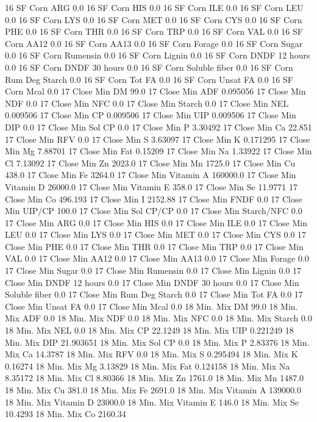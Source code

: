 \documentclass[letterpaper,10pt,english]{sphinxmanual}
\begin{document}
\begin{sphinxVerbatim}[commandchars=\\\{\},numbers=left,firstnumber=1,stepnumber=1]
16 SF Corn ARG 0.0
16 SF Corn HIS 0.0
16 SF Corn ILE 0.0
16 SF Corn LEU 0.0
16 SF Corn LYS 0.0
16 SF Corn MET 0.0
16 SF Corn CYS 0.0
16 SF Corn PHE 0.0
16 SF Corn THR 0.0
16 SF Corn TRP 0.0
16 SF Corn VAL 0.0
16 SF Corn AA\PYGZsh{}12 0.0
16 SF Corn AA\PYGZsh{}13 0.0
16 SF Corn \PYGZpc{} Forage 0.0
16 SF Corn Sugar \PYGZpc{} 0.0
16 SF Corn Rumensin 0.0
16 SF Corn Lignin 0.0
16 SF Corn DNDF 12 hours 0.0
16 SF Corn DNDF 30 hours 0.0
16 SF Corn Soluble fiber 0.0
16 SF Corn Rum Deg Starch 0.0
16 SF Corn Tot FA 0.0
16 SF Corn Unsat FA 0.0
16 SF Corn Mcal 0.0
17 Close Min DM 99.0
17 Close Min ADF 0.095056
17 Close Min NDF 0.0
17 Close Min NFC 0.0
17 Close Min Starch 0.0
17 Close Min NEL 0.009506
17 Close Min CP 0.009506
17 Close Min UIP 0.009506
17 Close Min DIP 0.0
17 Close Min Sol CP 0.0
17 Close Min P 3.30492
17 Close Min Ca 22.851
17 Close Min RFV 0.0
17 Close Min S 3.63097
17 Close Min K 0.171295
17 Close Min Mg 7.88701
17 Close Min Fat 0.15209
17 Close Min Na 1.33922
17 Close Min Cl 7.13092
17 Close Min Zn 2023.0
17 Close Min Mn 1725.0
17 Close Min Cu 438.0
17 Close Min Fe 3264.0
17 Close Min Vitamin A 160000.0
17 Close Min Vitamin D 26000.0
17 Close Min Vitamin E 358.0
17 Close Min Se 11.9771
17 Close Min Co 496.193
17 Close Min I 2152.88
17 Close Min FNDF 0.0
17 Close Min UIP/CP 100.0
17 Close Min Sol CP/CP 0.0
17 Close Min Starch/NFC 0.0
17 Close Min ARG 0.0
17 Close Min HIS 0.0
17 Close Min ILE 0.0
17 Close Min LEU 0.0
17 Close Min LYS 0.0
17 Close Min MET 0.0
17 Close Min CYS 0.0
17 Close Min PHE 0.0
17 Close Min THR 0.0
17 Close Min TRP 0.0
17 Close Min VAL 0.0
17 Close Min AA\PYGZsh{}12 0.0
17 Close Min AA\PYGZsh{}13 0.0
17 Close Min \PYGZpc{} Forage 0.0
17 Close Min Sugar \PYGZpc{} 0.0
17 Close Min Rumensin 0.0
17 Close Min Lignin 0.0
17 Close Min DNDF 12 hours 0.0
17 Close Min DNDF 30 hours 0.0
17 Close Min Soluble fiber 0.0
17 Close Min Rum Deg Starch 0.0
17 Close Min Tot FA 0.0
17 Close Min Unsat FA 0.0
17 Close Min Mcal 0.0
18 Min. Mix DM 99.0
18 Min. Mix ADF 0.0
18 Min. Mix NDF 0.0
18 Min. Mix NFC 0.0
18 Min. Mix Starch 0.0
18 Min. Mix NEL 0.0
18 Min. Mix CP 22.1249
18 Min. Mix UIP 0.221249
18 Min. Mix DIP 21.903651
18 Min. Mix Sol CP 0.0
18 Min. Mix P 2.83376
18 Min. Mix Ca 14.3787
18 Min. Mix RFV 0.0
18 Min. Mix S 0.295494
18 Min. Mix K 0.16274
18 Min. Mix Mg 3.13829
18 Min. Mix Fat 0.124158
18 Min. Mix Na 8.35172
18 Min. Mix Cl 8.80366
18 Min. Mix Zn 1761.0
18 Min. Mix Mn 1487.0
18 Min. Mix Cu 381.0
18 Min. Mix Fe 2691.0
18 Min. Mix Vitamin A 139000.0
18 Min. Mix Vitamin D 23000.0
18 Min. Mix Vitamin E 146.0
18 Min. Mix Se 10.4293
18 Min. Mix Co 2160.34

\end{sphinxVerbatim}
\end{document}
